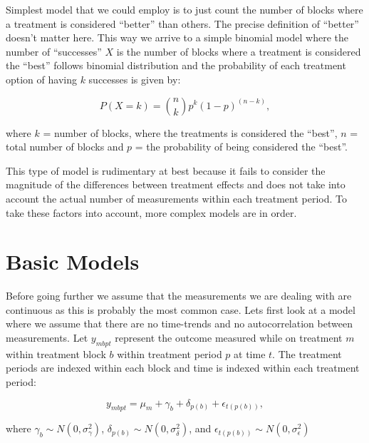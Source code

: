 \documentclass[12pt,a4paper,leqno]{report}
\theoremstyle{plain}
\theoremstyle{definition}
\theoremstyle{remark}
\begin{document}
Simplest model that we could employ is to just count the number of blocks where
a treatment is considered ``better'' than others. The precise definition of
``better'' doesn't matter here. This way we arrive to a simple binomial model
where the number of ``successes'' \(X\) is the number of blocks where a
treatment is considered the ``best'' follows binomial distribution and the
probability of each treatment option of having \(k\) successes is given by:

\begin{def}\label{}
    \begin{equation}
        P(X = k) = {n\choose k}p^k{(1-p)}^{(n-k)},
    \end{equation}
\end{def}where \(k\) = number of blocks, where the treatments is considered the
``best'', \(n\) = total number of blocks and \(p\) = the probability of being
considered the ``best''.

This type of model is rudimentary at best because it fails to consider the
magnitude of the differences between treatment effects and does not take into
account the actual number of measurements within each treatment period. To take
these factors into account, more complex models are in order.

\section{Basic Models}\label{conti}

Before going further we assume that the measurements we are dealing with are continuous
as this is probably the most common case. Lets first look at a model where
we assume that there are no time-trends and no autocorrelation between
measurements. Let \(y_{mbpt}\) represent the outcome measured while on treatment
\(m\) within treatment block \(b\) within treatment period \(p\) at time \(t\).
The treatment periods are indexed within each block and time is indexed within
each treatment period:

\begin{def}\label{}
    \begin{equation}\label{allerrors}
        y_{mbpt} = \mu_m + \gamma_b + \delta_{p(b)} + \epsilon_{t(p(b))},
    \end{equation}
\end{def}where \(\gamma_b \sim N(0,\sigma^2_{\gamma})\), \(\delta_{p(b)} \sim
N(0,\sigma^2_{\delta})\), and \(\epsilon_{t(p(b))} \sim
N(0,\sigma^2_{\epsilon})\)
\end{document}
